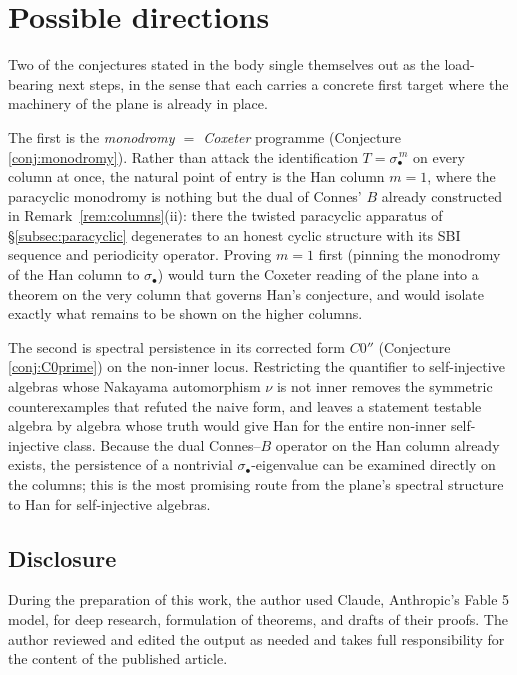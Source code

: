 \documentclass[11pt]{amsart}
\theoremstyle{definition}
\begin{document}
\section{Possible directions}\label{sec:quest}

Two of the conjectures stated in the body single themselves out as the load-bearing
next steps, in the sense that each carries a concrete first target where the
machinery of the plane is already in place.

The first is the \emph{monodromy $=$ Coxeter} programme (Conjecture
\ref{conj:monodromy}). Rather than attack the identification $T=\sigma_\bullet^{\,m}$
on every column at once, the natural point of entry is the Han column $m=1$, where
the paracyclic monodromy is nothing but the dual of Connes' $B$ already constructed
in Remark~\ref{rem:columns}(ii): there the twisted paracyclic apparatus of
\S\ref{subsec:paracyclic} degenerates to an honest cyclic structure with its SBI
sequence and periodicity operator. Proving $m=1$ first (pinning the monodromy of
the Han column to $\sigma_\bullet$) would turn the Coxeter reading of the plane
into a theorem on the very column that governs Han's conjecture, and would isolate
exactly what remains to be shown on the higher columns.

The second is spectral persistence in its corrected form $C0''$ (Conjecture
\ref{conj:C0prime}) on the non-inner locus. Restricting the quantifier to
self-injective algebras whose Nakayama automorphism $\nu$ is not inner removes the
symmetric counterexamples that refuted the naive form, and leaves a statement
testable algebra by algebra whose truth would give Han for the entire non-inner
self-injective class. Because the dual Connes--$B$ operator on the Han column
already exists, the persistence of a nontrivial $\sigma_\bullet$-eigenvalue can be
examined directly on the columns; this is the most promising route from the
plane's spectral structure to Han for self-injective algebras.

\subsection*{Disclosure}
During the preparation of this work, the author used Claude, Anthropic's
Fable 5 model, for deep research, formulation of theorems, and drafts of
their proofs. The author reviewed and edited the output as needed and takes
full responsibility for the content of the published article.
\end{document}
